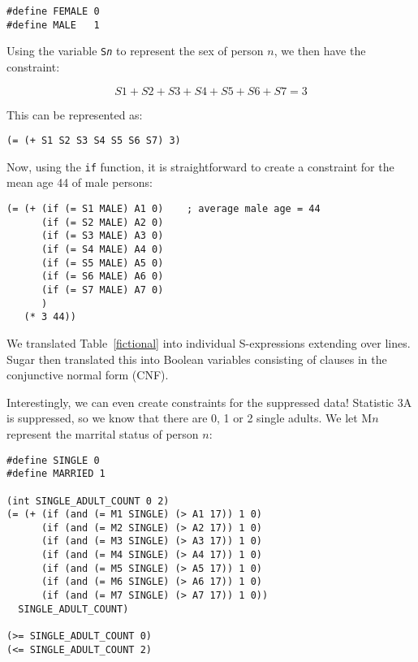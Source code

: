 \documentclass[runningheads]{llncs}
\begin{document}
\begin{Verbatim}
#define FEMALE 0
#define MALE   1
\end{Verbatim} 

Using the variable \texttt{S\emph{n}} to represent the sex of person
$n$, we then have the constraint:

\begin{equation}
S1 + S2 + S3 + S4 + S5 + S6 + S7 = 3
\end{equation}

This can be represented as:

\begin{Verbatim}
(= (+ S1 S2 S3 S4 S5 S6 S7) 3)
\end{Verbatim}

Now, using the \texttt{if} function, it is straightforward to create a constraint for
the mean age 44 of male persons:

\begin{Verbatim}
(= (+ (if (= S1 MALE) A1 0)    ; average male age = 44
      (if (= S2 MALE) A2 0)
      (if (= S3 MALE) A3 0)
      (if (= S4 MALE) A4 0)
      (if (= S5 MALE) A5 0)
      (if (= S6 MALE) A6 0)
      (if (= S7 MALE) A7 0)
      )
   (* 3 44))
\end{Verbatim}

We translated Table~\ref{fictional} into \NumSExpressions{} individual
S-expressions extending over \NumConstraintLines{} lines. Sugar then
translated this into \NumVariables Boolean variables consisting of
\NumClauses clauses in the conjunctive normal form (CNF). 

Interestingly, we can even create constraints for the suppressed data!
Statistic 3A is suppressed, so we know that there are 0, 1 or 2 single
adults. We let $\textrm{M}n$ represent the marrital status of person
$n$:

\begin{Verbatim}
#define SINGLE 0
#define MARRIED 1

(int SINGLE_ADULT_COUNT 0 2)
(= (+ (if (and (= M1 SINGLE) (> A1 17)) 1 0)
      (if (and (= M2 SINGLE) (> A2 17)) 1 0)      
      (if (and (= M3 SINGLE) (> A3 17)) 1 0)      
      (if (and (= M4 SINGLE) (> A4 17)) 1 0)      
      (if (and (= M5 SINGLE) (> A5 17)) 1 0)      
      (if (and (= M6 SINGLE) (> A6 17)) 1 0)      
      (if (and (= M7 SINGLE) (> A7 17)) 1 0))
  SINGLE_ADULT_COUNT)

(>= SINGLE_ADULT_COUNT 0)
(<= SINGLE_ADULT_COUNT 2)
\end{Verbatim}
\end{document}
